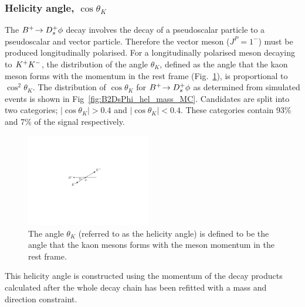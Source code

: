 


\subsubsection{Helicity angle, $\cos\theta_{K}$} 

The ${{{B}^+}}\!\rightarrow {\ensuremath{{D}^+_{s}}}\phi$ decay involves the decay of a pseudoscalar particle to a pseudoscalar and vector particle. Therefore the \phiz vector meson ($J^{P} = 1^{-}$) must be produced longitudinally polarised. For a longitudinally polarised \phiz meson decaying to ${{K}^+}{{K}^-}$, the distribution of the angle $\theta_{K}$, defined as the angle that the kaon meson forms with the \Bp momentum in the \phiz rest frame (Fig.~\ref{fig:B2DsPhi_helicity_angle}), is proportional to $\cos^{2}{\theta_{K}}$. The distribution of $\cos{\theta_{K}}$ for ${{{B}^+}}\!\rightarrow {\ensuremath{{D}^+_{s}}}\phi$ as determined from simulated events is shown in Fig~\ref{fig:B2DsPhi_hel_mass_MC}. Candidates are split into two categories; $|\cos{\theta_{K}} |> 0.4$ and $|\cos{\theta_{K}} |< 0.4$. These categories contain 93\% and 7\% of the signal respectively.
\begin{figure}[!h]
    \centering
    \includegraphics[width=0.48\textwidth]{figs/B2DsPhi/helicityangle.pdf}
    \caption{The angle $\theta_{K}$ (referred to as the helicity angle) is defined to be the angle that the kaon mesons forms with the \Bp meson momentum in the \phiz rest frame.}
    \label{fig:B2DsPhi_helicity_angle}   
\end{figure}

This helicity angle is constructed using the momentum of the decay products calculated after the whole decay chain has been refitted with a \Dsp mass and \Bp direction constraint. 


